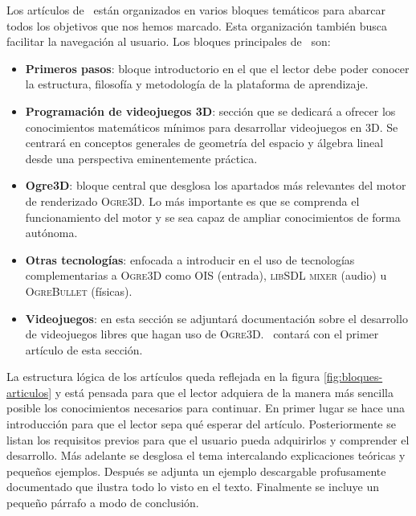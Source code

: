 \documentclass[a4paper,11pt]{article}
\begin{document}
\noindent Los artículos de \wiki\ están organizados en varios bloques temáticos
para abarcar todos los objetivos que nos hemos marcado.
Esta organización también busca facilitar la navegación
al usuario. Los bloques principales de \wiki\ son:\\

\begin{itemize}
    \itemsep0em
    \item \textbf{Primeros pasos}: bloque introductorio en el que el lector
    debe poder conocer la estructura, filosofía y metodología de la plataforma
    de aprendizaje.
    \item \textbf{Programación de videojuegos 3D}: sección que se dedicará
    a ofrecer los conocimientos matemáticos mínimos para desarrollar
    videojuegos en 3D. Se centrará en conceptos generales de geometría
    del espacio y álgebra lineal desde una perspectiva eminentemente práctica.
    \item \textbf{Ogre3D}: bloque central que desglosa los apartados más
    relevantes del motor de renderizado \textsc{Ogre3D}. Lo más
    importante es que se comprenda el funcionamiento del motor y se sea
    capaz de ampliar conocimientos de forma autónoma.
    \item \textbf{Otras tecnologías}: enfocada a introducir en el uso de
    tecnologías complementarias a \textsc{Ogre3D} como \textsc{OIS} (entrada),
    \textsc{libSDL mixer} (audio) u \textsc{OgreBullet} (físicas).
    \item \textbf{Videojuegos}: en esta sección se adjuntará documentación
    sobre el desarrollo de videojuegos libres que hagan uso de \textsc{Ogre3D}.
    \juego\ contará con el primer artículo de esta sección.
\end{itemize}

\noindent La estructura lógica de los artículos queda reflejada en la figura \ref{fig:bloques-articulos}
y está pensada para que el lector adquiera de la manera más sencilla posible
los conocimientos necesarios para continuar. En primer lugar se hace una
introducción para que el lector sepa qué esperar del artículo. Posteriormente
se listan los requisitos previos para que el usuario pueda adquirirlos y comprender
el desarrollo. Más adelante se desglosa el tema intercalando explicaciones teóricas
y pequeños ejemplos. Después se adjunta un ejemplo descargable profusamente documentado
que ilustra todo lo visto en el texto. Finalmente se incluye un pequeño párrafo
a modo de conclusión.\\
\end{document}
